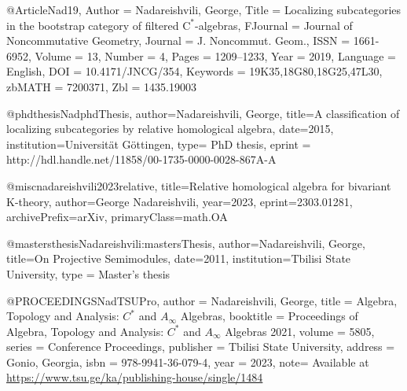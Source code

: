 @Article{Nad19,
 Author = {Nadareishvili, George},
 Title = {Localizing subcategories in the bootstrap category of filtered {{\(\mathrm{C}^\ast\)}}-algebras},
 FJournal = {Journal of Noncommutative Geometry},
 Journal = {J. Noncommut. Geom.},
 ISSN = {1661-6952},
 Volume = {13},
 Number = {4},
 Pages = {1209--1233},
 Year = {2019},
 Language = {English},
 DOI = {10.4171/JNCG/354},
 Keywords = {19K35,18G80,18G25,47L30},
 zbMATH = {7200371},
 Zbl = {1435.19003}
}

@phdthesis{NadphdThesis,
  author={Nadareishvili, George},
  title={A classification of localizing subcategories by relative homological algebra},
  date={2015},
  institution={Universit\"at G\"ottingen},
  type= {PhD thesis},
  eprint = {http://hdl.handle.net/11858/00-1735-0000-0028-867A-A}
}

@misc{nadareishvili2023relative,
      title={Relative homological algebra for bivariant K-theory}, 
      author={George Nadareishvili},
      year={2023},
      eprint={2303.01281},
      archivePrefix={arXiv},
      primaryClass={math.OA}
}

@mastersthesis{Nadareishvili:mastersThesis,
  author={Nadareishvili, George},
  title={On Projective Semimodules},
  date={2011},
  institution={Tbilisi State University},
  type = {Master's thesis}
}

@PROCEEDINGS{NadTSUPro,
  author = {Nadareishvili, George},
  title = {Algebra, Topology and Analysis: $C^*$ and $A_{\infty}$ Algebras},
  booktitle = {Proceedings of Algebra, Topology and Analysis: $C^*$ and $A_{\infty}$ Algebras 2021},
  volume = 5805,
  series = {Conference Proceedings},
  publisher = {Tbilisi State University},
  address = {Gonio, Georgia},
  isbn = {978-9941-36-079-4},
  year = {2023},
  note= {Available at \url{https://www.tsu.ge/ka/publishing-house/single/1484}}
}
